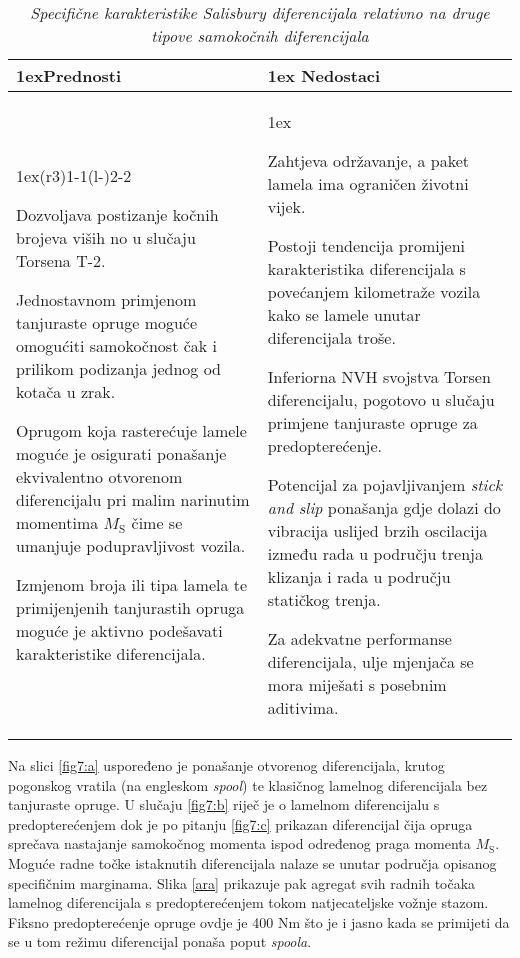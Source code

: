 \documentclass[11pt]{article}
\numberwithin{equation}{section}%
\begin{document}
\begin{table}[ht    ]%
\begin{tabularx}{\linewidth}{>{\parskip1ex}X@{\kern4\tabcolsep}>{\parskip1ex}X}
\toprule
\hfil\bfseries Prednosti
&
\hfil\bfseries Nedostaci
\\\cmidrule(r{3\tabcolsep}){1-1}\cmidrule(l{-\tabcolsep}){2-2}

Dozvoljava postizanje kočnih brojeva viših no u slučaju Torsena T-2.\par
Jednostavnom primjenom tanjuraste opruge moguće omogućiti samokočnost čak i prilikom podizanja jednog od kotača u zrak.
\par
Oprugom koja rasterećuje lamele moguće je osigurati ponašanje ekvivalentno otvorenom diferencijalu pri malim narinutim momentima $M_\text{S}$ čime se umanjuje podupravljivost vozila.
\par 
Izmjenom broja ili tipa lamela te primijenjenih tanjurastih opruga moguće je aktivno podešavati karakteristike diferencijala.

&

Zahtjeva održavanje, a paket lamela ima ograničen životni vijek.\par
Postoji tendencija promijeni karakteristika diferencijala s povećanjem kilometraže vozila kako se lamele unutar diferencijala troše.
\par 
Inferiorna NVH svojstva Torsen diferencijalu, pogotovo u slučaju primjene tanjuraste opruge za predopterećenje.
\par 
Potencijal za pojavljivanjem \textit{stick and slip} ponašanja gdje dolazi do vibracija uslijed brzih oscilacija između rada u području trenja klizanja i rada u području statičkog trenja.
\par 
Za adekvatne performanse diferencijala, ulje mjenjača se mora miješati s posebnim aditivima.

\\\bottomrule
\end{tabularx}
\caption{\textit{Specifične karakteristike Salisbury diferencijala relativno na druge tipove samokočnih diferencijala}}
\label{tab3}
\end{table} 

Na slici \ref{fig7:a} uspoređeno je ponašanje otvorenog diferencijala, krutog pogonskog vratila (na engleskom \textit{spool}) te klasičnog lamelnog diferencijala bez tanjuraste opruge. U slučaju \ref{fig7:b} riječ je o lamelnom diferencijalu s predopterećenjem dok je po pitanju \ref{fig7:c} prikazan diferencijal čija opruga sprečava nastajanje samokočnog momenta ispod određenog praga momenta $M_\text{S}$. Moguće radne točke istaknutih diferencijala nalaze se unutar područja opisanog specifičnim marginama. Slika \ref{ara} prikazuje pak agregat svih radnih točaka lamelnog diferencijala s predopterećenjem tokom natjecateljske vožnje stazom. Fiksno predopterećenje opruge ovdje je 400 Nm što je i jasno kada se primijeti da se u tom režimu diferencijal ponaša poput \textit{spoola}.
\end{document}
